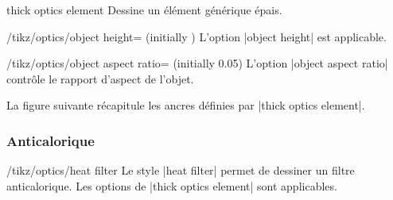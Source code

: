\documentclass[a4paper]{ltxdoc}
\begin{document}
\begin{shape}{thick optics element}
Dessine un élément générique épais.

\begin{codeexample}[width=6cm]
\end{codeexample}


\begin{key}{/tikz/optics/object height= (initially )}
    L'option |object height| est applicable.
\end{key}


\begin{key}{/tikz/optics/object aspect ratio= (initially 0.05)}
    L'option |object aspect ratio| contrôle le rapport d'aspect de l'objet.
\end{key}




La figure suivante récapitule les ancres définies par |thick optics element|.

\begin{codeexample}[]
\Huge
{}
\end{codeexample}

\end{shape}

\subsubsection{Anticalorique}

\begin{stylekey}{/tikz/optics/heat filter}
Le style |heat filter| permet de dessiner un filtre anticalorique. Les options de |thick optics element| sont applicables.

\begin{codeexample}[width=6cm]
\end{codeexample}
\end{stylekey}
\end{document}
